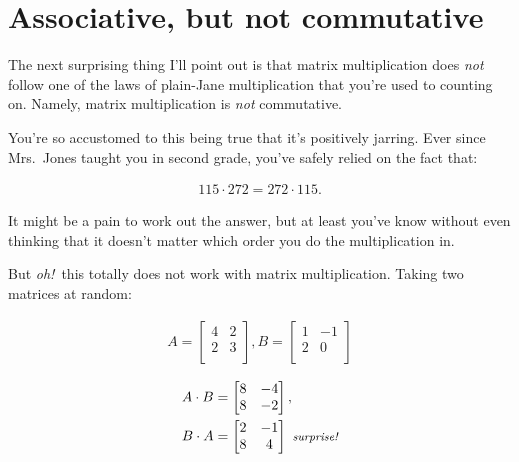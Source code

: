 \section{Associative, but not commutative}


The next surprising thing I'll point out is that matrix multiplication does
\textit{not} follow one of the laws of plain-Jane multiplication that you're
used to counting on. Namely, matrix multiplication is \textit{not} commutative.

You're so accustomed to this being true that it's positively jarring. Ever
since Mrs.~Jones taught you in second grade, you've safely relied on the fact
that:

\vspace{-.15in}
\begin{align*}
115 \cdot 272 = 272 \cdot 115.
\end{align*}
\vspace{-.15in}

It might be a pain to work out the answer, but at least you've know without
even thinking that it doesn't matter which order you do the multiplication in.

But \textit{oh!}~this totally does not work with matrix multiplication. Taking
two matrices at random:

\vspace{-.15in}
\begin{align*}
A =
\begin{bmatrix}
4 & 2 \\
2 & 3 \\
\end{bmatrix},
B =
\begin{bmatrix}
1 & -1 \\
2 & 0 \\
\end{bmatrix}\\
\end{align*}
\vspace{-.55in}
\begin{align*}
A \cdot B &=
\begin{bmatrix}
8 & -4 \\
8 & -2 \\
\end{bmatrix}, \\
B \cdot A &=
\begin{bmatrix}
2 & -1 \\
8 & 4 \\
\end{bmatrix}\ {\footnotesize \textit{surprise!}}
\end{align*}
\vspace{-.15in}

